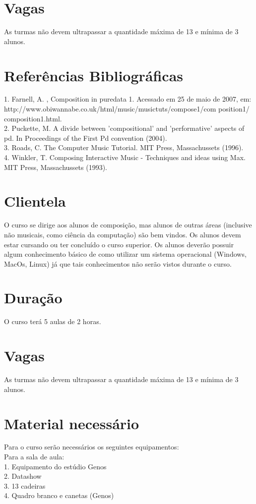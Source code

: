 \documentclass{article}
\begin{document}
\section {Vagas}

As turmas não devem ultrapassar a quantidade máxima de 13 e mínima de 3 alunos.

\section {Referências Bibliográficas}
1. Farnell, A. , Composition in puredata 1. Acessado em 25 de maio de 2007, em:\\
http://www.obiwannabe.co.uk/html/music/musictuts/compose1/com
position1/
composition1.html.\\
2. Puckette, M. A divide between ’compositional’ and ’performative’ aspects of pd. In
Proceedings of the First Pd convention (2004).\\
3. Roads, C. The Computer Music Tutorial. MIT Press, Massachussets (1996).\\
4. Winkler, T. Composing Interactive Music - Techniques and ideas using Max. MIT Press,
Massachussets (1993).

\section { Clientela}
O curso se dirige aos alunos de composição, mas alunos de outras áreas (inclusive não
musicais, como ciência da computação) são bem vindos. Os alunos devem estar cursando
ou ter concluído o curso superior. Os alunos deverão possuir algum conhecimento básico de
como utilizar um sistema operacional (Windows, MacOs, Linux) já que tais conhecimentos
não serão vistos durante o curso.
\section {Duração} 
O curso terá 5 aulas de 2 horas.

\section {Vagas} 
As turmas não devem ultrapassar a quantidade máxima de 13 e mínima de 3 alunos.
\section {Material necessário}  
Para o curso serão necessários os seguintes equipamentos:\\
Para a sala de aula:\\
1. Equipamento do estúdio Genos\\
2. Datashow\\
3. 13 cadeiras\\
4. Quadro branco e canetas (Genos)\\
\end{document}
